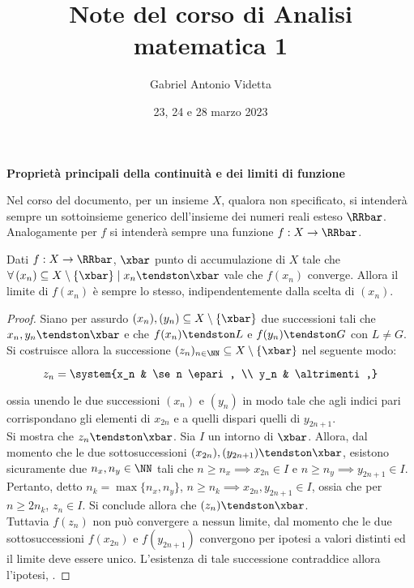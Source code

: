 \documentclass[11pt]{article}
\title{\textbf{Note del corso di Analisi matematica 1}}
\author{Gabriel Antonio Videtta}
\date{23, 24 e 28 marzo 2023}
\begin{document}
	
	\maketitle
	
	\wip
	
	\begin{center}
		\Large \textbf{Proprietà principali della continuità e dei limiti di funzione}
	\end{center}
	
	\begin{note} Nel corso del documento, per un insieme $X$, qualora non
		specificato, si intenderà sempre un sottoinsieme generico dell'insieme
		dei numeri reali esteso $\RRbar$. Analogamente per $f$ si intenderà
		sempre una funzione $f : X \to \RRbar$.
	\end{note}
	
	\begin{proposition}
		Dati $f : X \to \RRbar$, $\xbar$ punto di accumulazione di $X$
		tale che $\forall \, (x_n) \subseteq X \setminus \{\xbar\} \mid x_n \tendston \xbar$ vale che
		$f(x_n)$ converge. Allora il limite di $f(x_n)$ è sempre lo stesso, indipendentemente
		dalla scelta di $(x_n)$.
	\end{proposition}

	\begin{proof}
		Siano per assurdo $(x_n), (y_n) \subseteq X \setminus \{\xbar\}$ due successioni tali che
		$x_n, y_n \tendston \xbar$ e che $f(x_n) \tendston L$ e $f(y_n) \tendston G$ con $L \neq G$. Si
		costruisce allora la successione $(z_n)_{n \in \NN} \subseteq X \setminus \{\xbar\}$ nel seguente modo:
		
		\[ z_n = \system{x_n & \se n \epari, \\ y_n & \altrimenti,} \]
		
		\vskip 0.05in
		
		ossia unendo le due successioni $(x_n)$ e $(y_n)$ in modo tale che agli indici pari corrispondano gli
		elementi di $x_{2n}$ e a quelli dispari quelli di $y_{2n+1}$. \\
		
		Si mostra che $z_n \tendston \xbar$. Sia $I$ un intorno di $\xbar$. Allora, dal momento che le due sottosuccessioni
		$(x_{2n}), (y_{2n+1}) \tendston \xbar$, esistono sicuramente due
		$n_x, n_y \in \NN$ tali che $n \geq n_x \implies x_{2n} \in I$ e $n \geq n_y \implies y_{2n+1} \in I$. Pertanto,
		detto $n_k = \max\{n_x, n_y\}$, $n \geq n_k \implies x_{2n}, y_{2n+1} \in I$, ossia che per $n \geq 2 n_k$,
		$z_n \in I$. Si conclude allora che $(z_n) \tendston \xbar$. \\
		
		Tuttavia $f(z_n)$ non può convergere a nessun limite, dal momento che le due sottosuccessioni
		$f(x_{2n})$ e $f(y_{2n+1})$ convergono per ipotesi a valori distinti ed il limite deve essere unico. L'esistenza di
		tale successione contraddice allora l'ipotesi, \Lightning.
	\end{proof}
\end{document}
